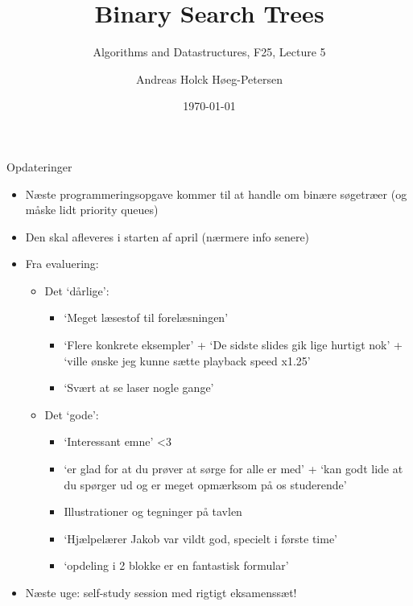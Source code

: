 \documentclass[aspectratio=1610]{beamer}
\title[ALG25 - Lecture 5]
{Binary Search Trees}
\subtitle
{Algorithms and Datastructures, F25, Lecture 5}
\author[Andreas H. Høeg-Petersen]
{Andreas Holck Høeg-Petersen}
\institute[AAU]{%
  Department of Computer Science\\
  Aalborg University
}
\date {\today}
\begin{document}
\begin{frame}
  \titlepage
\end{frame}

\begin{frame}{Opdateringer}{}
    \begin{itemize}[<+->]
        \small
        \item Næste programmeringsopgave kommer til at handle om binære
            søgetræer (og måske lidt priority queues)
        \item Den skal afleveres i starten af april (nærmere info senere)
        \item Fra evaluering:
            \begin{itemize}
                \item Det `dårlige':
                    \begin{itemize}
                        \item `Meget læsestof til forelæsningen'
                        \item `Flere konkrete eksempler' + `De sidste slides gik
                            lige hurtigt nok' + `ville ønske jeg kunne sætte
                            playback speed x1.25'
                        \item `Svært at se laser nogle gange'
                    \end{itemize}
                \item Det `gode':
                    \begin{itemize}
                        \item `Interessant emne' <3
                        \item `er glad for at du prøver at sørge for alle er
                            med' + `kan godt lide at du spørger ud og er meget
                            opmærksom på os studerende'
                        \item Illustrationer og tegninger på tavlen
                        \item `Hjælpelærer Jakob var vildt god, specielt i
                            første time'
                        \item `opdeling i 2 blokke er en fantastisk formular'
                    \end{itemize}
            \end{itemize}
        \item Næste uge: self-study session med rigtigt eksamenssæt!
    \end{itemize}
\end{frame}
\end{document}
